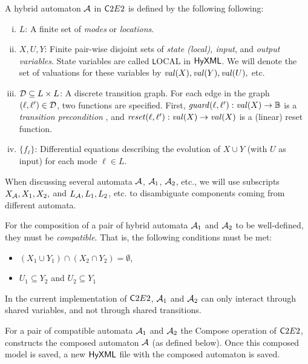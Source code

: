 \documentclass{tufte-book} %
\begin{document}
A hybrid automaton $\mathcal{A}$ in ${{\mathsf C2E2}}$ is defined by the following following: 
\begin{enumerate}[(i)]
\item $L$: A finite set of {\em modes} or {\em locations}.
\item $X,U,Y$: Finite pair-wise disjoint sets of {\em state (local), input}, and {\em output variables}. State variables are called {\texttt LOCAL} in ${{\sf HyXML}}$.
We will denote the  set of valuations for these variables by ${\mathit{val}(X)}, {\mathit{val}(Y)}, {\mathit{val}(U)},$ etc.
%
%
\item $\mathcal{D} \subseteq L \times L$: A discrete transition graph. For each edge in the graph $(\ell,\ell') \in \mathcal{D}$, two functions are specified. First, ${\mathit{guard}}(\ell,\ell'):{\mathit{val}(X)} \rightarrow {\mathbb{B}}$ is a {\em transition precondition \/}, and 
${\mathit{reset}}(\ell,\ell'): {\mathit{val}(X)} \rightarrow {\mathit{val}(X)}$ is a (linear) reset function.
\item $\{f_{\ell}\}$: Differential equations describing the evolution of $X \cup Y$ (with $U$ as input) for each mode $\ell \in L$.
\end{enumerate}
When discussing several automata $\mathcal{A}$, $\mathcal{A}_1$, $\mathcal{A}_2$, etc., we will use subscripts $X_{\mathcal{A}}, X_1, X_2,$ and $L_{\mathcal{A}}, L_1, L_2$, etc. to disambiguate components coming from different automata.

For the composition of a pair of hybrid automata $\mathcal{A}_1$ and $\mathcal{A}_2$ to be well-defined, they must be {\em compatible\/}. That is, the following conditions must be met:
\begin{itemize}
    \item $(X_1 \cup Y_1) \cap (X_2 \cap Y_2) = \emptyset$,
    \item $U_1 \subseteq Y_2$ and $U_2 \subseteq Y_1$ 
\end{itemize}
In the current implementation of ${{\mathsf C2E2}}$, $\mathcal{A}_1$ and $\mathcal{A}_2$ can only interact through shared variables, and not through shared transitions.

For a pair of compatible automata $\mathcal{A}_1$ and $\mathcal{A}_2$ the {\sf Compose\/} operation of ${{\mathsf C2E2}}$, constructs the composed automaton $\mathcal{A}$ (as defined below). Once this composed model is saved, a new ${{\sf HyXML}}$ file with the composed automaton is saved.
\end{document}
